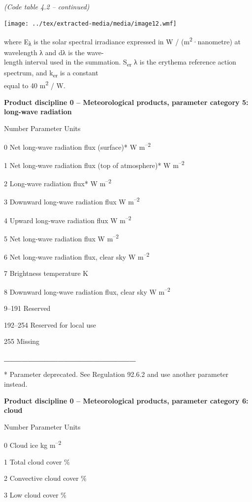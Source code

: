 \emph{\\
(Code table 4.2 -- continued)}

\texttt{[image: ../tex/extracted-media/media/image12.wmf]}

where E\textsubscript{λ} is the solar spectral irradiance expressed in W / (m\textsuperscript{2}·nanometre) at wavelength λ and dλ is the wave-\\
length interval used in the summation. S\textsubscript{er} λ is the erythema reference action spectrum, and k\textsubscript{er} is a constant\\
equal to 40 m\textsuperscript{2} / W.

\textbf{Product discipline 0 -- Meteorological products, parameter category 5: long-wave radiation}

Number Parameter Units

0 Net long-wave radiation flux (surface)* W m\textsuperscript{--2}

1 Net long-wave radiation flux (top of atmosphere)* W m\textsuperscript{--2}

2 Long-wave radiation flux* W m\textsuperscript{--2}

3 Downward long-wave radiation flux W m\textsuperscript{--2}

4 Upward long-wave radiation flux W m\textsuperscript{--2}

5 Net long-wave radiation flux W m\textsuperscript{--2}

6 Net long-wave radiation flux, clear sky W m\textsuperscript{--2}

7 Brightness temperature K

8 Downward long-wave radiation flux, clear sky W m\textsuperscript{--2}

9--191 Reserved

192--254 Reserved for local use

255 Missing

\textbf{\_\_\_\_\_\_\_\_\_\_\_\_\_\_\_\_\_\_\_\_\_\_}

* Parameter deprecated. See Regulation 92.6.2 and use another parameter instead.

\textbf{Product discipline 0 -- Meteorological products, parameter category 6: cloud}

Number Parameter Units

0 Cloud ice kg m\textsuperscript{--2}

1 Total cloud cover \%

2 Convective cloud cover \%

3 Low cloud cover \%

